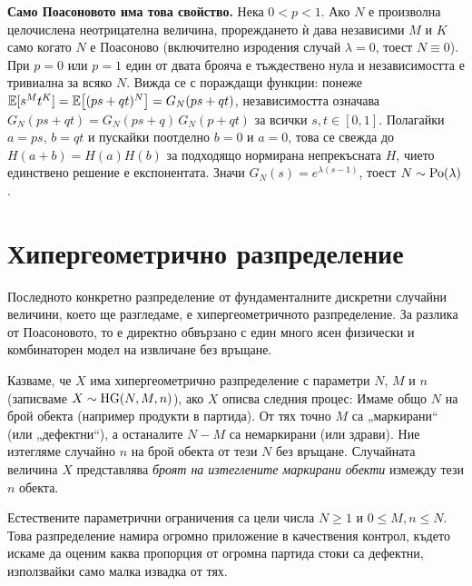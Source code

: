 \begin{supp}
\textbf{Само Поасоновото има това свойство.} Нека $0 < p < 1$. Ако $N$ е произволна целочислена
неотрицателна величина, прореждането ѝ дава независими $M$ и $K$ само когато $N$ е Поасоново
(включително изродения случай $\lambda = 0$, тоест $N \equiv 0$). При $p = 0$ или $p = 1$ един
от двата брояча е тъждествено нула и независимостта е тривиална за всяко $N$. Вижда се с пораждащи функции: понеже
$\mathbb{E}[s^M t^K] = \mathbb{E}\big[(ps+qt)^N\big] = G_N(ps+qt)$, независимостта означава
$G_N(ps+qt) = G_N(ps+q)\,G_N(p+qt)$ за всички $s,t \in [0,1]$. Полагайки $a = ps$, $b = qt$ и
пускайки поотделно $b=0$ и $a=0$, това се свежда до $H(a+b) = H(a)H(b)$ за подходящо
нормирана непрекъсната $H$, чието единствено решение е експонентата. Значи
$G_N(s) = e^{\lambda(s-1)}$, тоест $N \sim \operatorname{Po}(\lambda)$.
\end{supp}


\section{Хипергеометрично разпределение}

Последното конкретно разпределение от фундаменталните дискретни случайни величини, което ще разгледаме, е хипергеометричното разпределение. За разлика от Поасоновото, то е директно обвързано с един много ясен физически и комбинаторен модел на извличане без връщане.

\begin{defn}
Казваме, че $X$ има хипергеометрично разпределение с параметри $N$, $M$ и $n$ (записваме $X \sim \operatorname{HG}(N, M, n)$), ако $X$ описва следния процес:
Имаме общо $N$ на брой обекта (например продукти в партида). От тях точно $M$ са „маркирани“ (или „дефектни“), а останалите $N - M$ са немаркирани (или здрави). Ние изтегляме случайно $n$ на брой обекта от тези $N$ без връщане. Случайната величина $X$ представлява \emph{броят на изтеглените маркирани обекти} измежду тези $n$ обекта.
\end{defn}

Естествените параметрични ограничения са цели числа $N\ge 1$ и $0\le M,n\le N$. Това разпределение намира огромно приложение в качествения контрол, където искаме да оценим каква пропорция от огромна партида стоки са дефектни, използвайки само малка извадка от тях.

